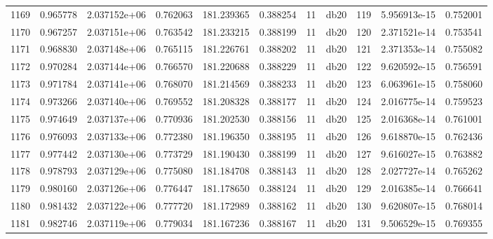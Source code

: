 \begin{tabular}{lrrrrrrlrrr}
1169 &    0.965778 &        2.037152e+06 &  0.762063 &              181.239365 &    0.388254 &      11 &         db20 &    119 &   5.956913e-15 &      0.752001 \\
1170 &    0.967257 &        2.037151e+06 &  0.763542 &              181.233215 &    0.388199 &      11 &         db20 &    120 &   2.371521e-14 &      0.753541 \\
1171 &    0.968830 &        2.037148e+06 &  0.765115 &              181.226761 &    0.388202 &      11 &         db20 &    121 &   2.371353e-14 &      0.755082 \\
1172 &    0.970284 &        2.037144e+06 &  0.766570 &              181.220688 &    0.388229 &      11 &         db20 &    122 &   9.620592e-15 &      0.756591 \\
1173 &    0.971784 &        2.037141e+06 &  0.768070 &              181.214569 &    0.388233 &      11 &         db20 &    123 &   6.063961e-15 &      0.758060 \\
1174 &    0.973266 &        2.037140e+06 &  0.769552 &              181.208328 &    0.388177 &      11 &         db20 &    124 &   2.016775e-14 &      0.759523 \\
1175 &    0.974649 &        2.037137e+06 &  0.770936 &              181.202530 &    0.388156 &      11 &         db20 &    125 &   2.016368e-14 &      0.761001 \\
1176 &    0.976093 &        2.037133e+06 &  0.772380 &              181.196350 &    0.388195 &      11 &         db20 &    126 &   9.618870e-15 &      0.762436 \\
1177 &    0.977442 &        2.037130e+06 &  0.773729 &              181.190430 &    0.388199 &      11 &         db20 &    127 &   9.616027e-15 &      0.763882 \\
1178 &    0.978793 &        2.037129e+06 &  0.775080 &              181.184708 &    0.388143 &      11 &         db20 &    128 &   2.027727e-14 &      0.765262 \\
1179 &    0.980160 &        2.037126e+06 &  0.776447 &              181.178650 &    0.388124 &      11 &         db20 &    129 &   2.016385e-14 &      0.766641 \\
1180 &    0.981432 &        2.037122e+06 &  0.777720 &              181.172989 &    0.388162 &      11 &         db20 &    130 &   9.620807e-15 &      0.768014 \\
1181 &    0.982746 &        2.037119e+06 &  0.779034 &              181.167236 &    0.388167 &      11 &         db20 &    131 &   9.506529e-15 &      0.769355 \\

\end{tabular}
